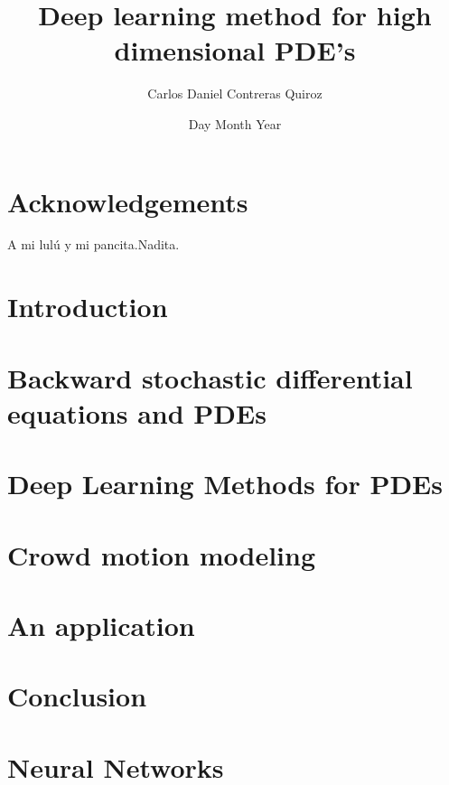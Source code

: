\documentclass[11pt]{report}
\title{Deep learning method for high dimensional PDE's}
\author{Carlos Daniel Contreras Quiroz}
\date{Day Month Year}
\begin{document}





\chapter*{Acknowledgements}
A mi lulú y mi pancita.Nadita.


\tableofcontents






\chapter{Introduction}


\chapter{Backward stochastic differential equations and PDEs}


\chapter{Deep Learning Methods for PDEs}


\chapter{Crowd motion modeling}


\chapter{An application}


\chapter{Conclusion}


\appendix
\chapter{Neural Networks}



\printbibliography
\end{document}
